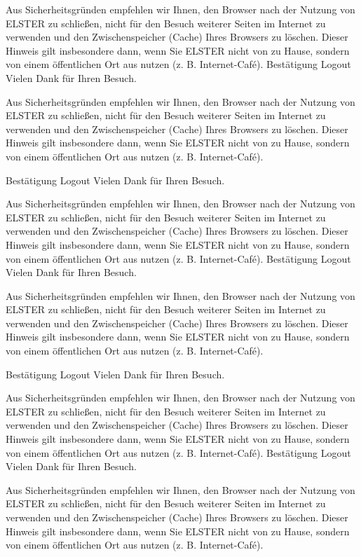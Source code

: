 \documentclass[11pt]{scrlttr2}
\begin{document}
\begin{letter}{}
        Aus Sicherheitsgründen empfehlen wir Ihnen, den Browser nach der Nutzung von ELSTER zu schließen, nicht für den Besuch weiterer Seiten im Internet zu verwenden und den Zwischenspeicher (Cache) Ihres Browsers zu löschen. Dieser Hinweis gilt insbesondere dann, wenn Sie ELSTER nicht von zu Hause, sondern von einem öffentlichen Ort aus nutzen (z. B. Internet-Café).
        Bestätigung Logout
        Vielen Dank für Ihren Besuch.

        Aus Sicherheitsgründen empfehlen wir Ihnen, den Browser nach der Nutzung von ELSTER zu schließen, nicht für den Besuch weiterer Seiten im Internet zu verwenden und den Zwischenspeicher (Cache) Ihres Browsers zu löschen. Dieser Hinweis gilt insbesondere dann, wenn Sie ELSTER nicht von zu Hause, sondern von einem öffentlichen Ort aus nutzen (z. B. Internet-Café).

        Bestätigung Logout
        Vielen Dank für Ihren Besuch.

        Aus Sicherheitsgründen empfehlen wir Ihnen, den Browser nach der Nutzung von ELSTER zu schließen, nicht für den Besuch weiterer Seiten im Internet zu verwenden und den Zwischenspeicher (Cache) Ihres Browsers zu löschen. Dieser Hinweis gilt insbesondere dann, wenn Sie ELSTER nicht von zu Hause, sondern von einem öffentlichen Ort aus nutzen (z. B. Internet-Café).
        Bestätigung Logout
        Vielen Dank für Ihren Besuch.

        Aus Sicherheitsgründen empfehlen wir Ihnen, den Browser nach der Nutzung von ELSTER zu schließen, nicht für den Besuch weiterer Seiten im Internet zu verwenden und den Zwischenspeicher (Cache) Ihres Browsers zu löschen. Dieser Hinweis gilt insbesondere dann, wenn Sie ELSTER nicht von zu Hause, sondern von einem öffentlichen Ort aus nutzen (z. B. Internet-Café).

        Bestätigung Logout
        Vielen Dank für Ihren Besuch.

        Aus Sicherheitsgründen empfehlen wir Ihnen, den Browser nach der Nutzung von ELSTER zu schließen, nicht für den Besuch weiterer Seiten im Internet zu verwenden und den Zwischenspeicher (Cache) Ihres Browsers zu löschen. Dieser Hinweis gilt insbesondere dann, wenn Sie ELSTER nicht von zu Hause, sondern von einem öffentlichen Ort aus nutzen (z. B. Internet-Café).
        Bestätigung Logout
        Vielen Dank für Ihren Besuch.

        Aus Sicherheitsgründen empfehlen wir Ihnen, den Browser nach der Nutzung von ELSTER zu schließen, nicht für den Besuch weiterer Seiten im Internet zu verwenden und den Zwischenspeicher (Cache) Ihres Browsers zu löschen. Dieser Hinweis gilt insbesondere dann, wenn Sie ELSTER nicht von zu Hause, sondern von einem öffentlichen Ort aus nutzen (z. B. Internet-Café).


\end{letter}
\end{document}

